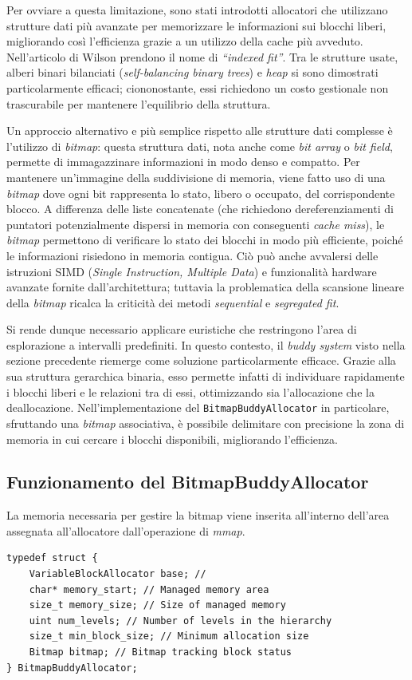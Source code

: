 Per ovviare a questa limitazione, sono stati introdotti allocatori che utilizzano strutture dati più avanzate per memorizzare le informazioni sui blocchi liberi, migliorando così l’efficienza grazie a un utilizzo della cache più avveduto. Nell’articolo di Wilson prendono il nome di \textit{“indexed fit”}. Tra le strutture usate, alberi binari bilanciati (\textit{self-balancing binary trees}) e \textit{heap} si sono dimostrati particolarmente efficaci; ciononostante, essi richiedono un costo gestionale non trascurabile per mantenere l’equilibrio della struttura.

Un approccio alternativo e più semplice rispetto alle strutture dati complesse è l’utilizzo di \textit{bitmap}: questa struttura dati, nota anche come \textit{bit array} o \textit{bit field}, permette di immagazzinare informazioni in modo denso e compatto.  Per mantenere un'immagine della suddivisione di memoria, viene fatto uso di una \textit{bitmap} dove ogni bit rappresenta lo stato, libero o occupato, del corrispondente blocco. A differenza delle liste concatenate (che richiedono dereferenziamenti di puntatori potenzialmente dispersi in memoria con conseguenti \textit{cache miss}), le \textit{bitmap} permettono di verificare lo stato dei blocchi in modo più efficiente, poiché le informazioni risiedono in memoria contigua. Ciò può anche avvalersi delle istruzioni SIMD (\textit{Single Instruction, Multiple Data}) e funzionalità hardware avanzate fornite dall’architettura; tuttavia la problematica della scansione lineare della \textit{bitmap} ricalca la criticità dei metodi \textit{sequential} e \textit{segregated fit}.

Si rende dunque necessario applicare euristiche che restringono l’area di esplorazione a intervalli predefiniti. In questo contesto, il \textit{buddy system} visto nella sezione precedente riemerge come soluzione particolarmente efficace. Grazie alla sua struttura gerarchica binaria, esso permette infatti di individuare rapidamente i blocchi liberi e le relazioni tra di essi, ottimizzando sia l’allocazione che la deallocazione. Nell'implementazione del \texttt{BitmapBuddyAllocator} in particolare, sfruttando una \textit{bitmap} associativa, è possibile delimitare con precisione la zona di memoria in cui cercare i blocchi disponibili, migliorando l’efficienza.

\subsection*{Funzionamento del BitmapBuddyAllocator}
La memoria necessaria per gestire la bitmap viene inserita all'interno dell'area assegnata all'allocatore dall'operazione di \textit{mmap}.
\begin{lstlisting}
typedef struct {
    VariableBlockAllocator base; // 
    char* memory_start; // Managed memory area
    size_t memory_size; // Size of managed memory
    uint num_levels; // Number of levels in the hierarchy
    size_t min_block_size; // Minimum allocation size
    Bitmap bitmap; // Bitmap tracking block status
} BitmapBuddyAllocator;
\end{lstlisting}

